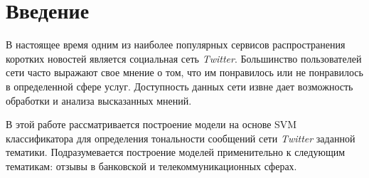 \section{Введение}

%
%

В настоящее время одним из наиболее популярных сервисов распространения
коротких новостей является социальная сеть {\it Twitter}. Большинство пользователей
сети часто выражают свое мнение о том, что им понравилось или не понравилось
в определенной сфере услуг. Доступность данных сети извне дает возможность
обработки и анализа высказанных мнений.

В этой работе рассматривается построение модели на основе SVM классификатора
для определения тональности сообщений сети {\it Twitter} заданной тематики.
Подразумевается построение моделей применительно к следующим тематикам:
отзывы в банковской и телекоммуникационных сферах.
